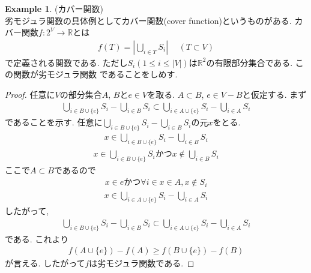 \documentclass[11pt, a4paper, dvipdfmx]{jsarticle}
\theoremstyle{definition}
\newtheorem{Example+}[Axiom+]{Example}
\newcommand{\R}{\mathbb{R}}
\newcommand{\dip}{\displaystyle }
\begin{document}
\begin{Example+}(カバー関数)\\
    劣モジュラ関数の具体例としてカバー関数(cover function)というものがある. カバー関数$f: 2^{V}\to\R$とは
    \begin{align*}
        f(T) = \left|\bigcup_{i\in T}S_{i}\right|\hspace{15pt}(T\subset V)
    \end{align*}
    で定義される関数である. ただし$S_{i}(1 \leq i\leq |V|)$は$\R^{2}$の有限部分集合である. この関数が劣モジュラ関数
    であることをしめす.
    \begin{proof}
        任意に$V$の部分集合$A$, $B$と$e\in V$を取る. $A\subset B$, $e\in V - B$と仮定する.
        まず
        \begin{align*}
            \bigcup_{i\in B\cup\{e\}}S_{i} - \bigcup_{i\in B}S_{i}\subset\bigcup_{i\in A\cup\{e\}}S_{i} - \bigcup_{i\in A}S_{i}
        \end{align*}
        であることを示す. 任意に$\dip \bigcup_{i\in B\cup\{e\}}S_{i} - \bigcup_{i\in B}S_{i}$の元$x$をとる.
        \begin{align*}
            x\in\bigcup_{i\in B\cup\{e\}}S_{i} - \bigcup_{i\in B}S_{i}
        \end{align*}
        \begin{align*}
            x\in\bigcup_{i\in B\cup\{e\}}S_{i} かつ x\notin\bigcup_{i\in B}S_{i}
        \end{align*}
        ここで$A\subset B$であるので
        \begin{align*}
            x\in eかつ\forall i\in x\in A, x\notin S_{i} 
        \end{align*}
        \begin{align*}
            x\in\bigcup_{i\in A\cup\{e\}}S_{i} - \bigcup_{i\in A}S_{i}
        \end{align*}
        したがって, 
        \begin{align*}
            \bigcup_{i\in B\cup\{e\}}S_{i} - \bigcup_{i\in B}S_{i}\subset\bigcup_{i\in A\cup\{e\}}S_{i} - \bigcup_{i\in A}S_{i}
        \end{align*}
        である. これより
        \begin{align*}
            f(A\cup\{e\}) - f(A) \geq f(B\cup\{e\}) - f(B)
        \end{align*}
        が言える. したがって$f$は劣モジュラ関数である.
    \end{proof}
\end{Example+}
\end{document}
